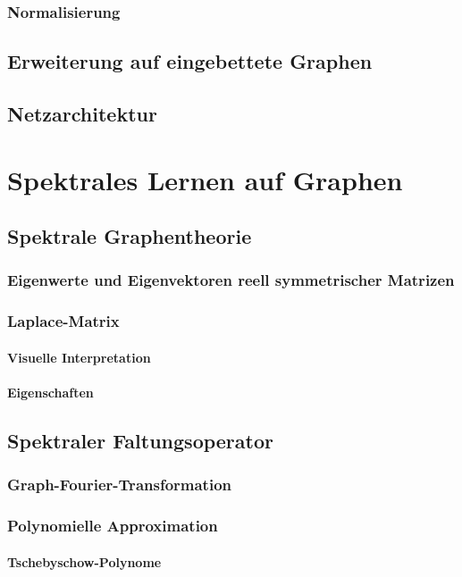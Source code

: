 \subsection{Normalisierung}
\section{Erweiterung auf eingebettete Graphen}
\section{Netzarchitektur}

\chapter{Spektrales Lernen auf Graphen}
\section{Spektrale Graphentheorie}
\subsection{Eigenwerte und Eigenvektoren reell symmetrischer Matrizen}
\subsection{Laplace-Matrix}
\subsubsection{Visuelle Interpretation}
\subsubsection{Eigenschaften}
\section{Spektraler Faltungsoperator}
\subsection{Graph-Fourier-Transformation}
\subsection{Polynomielle Approximation}
\subsubsection{Tschebyschow-Polynome}
